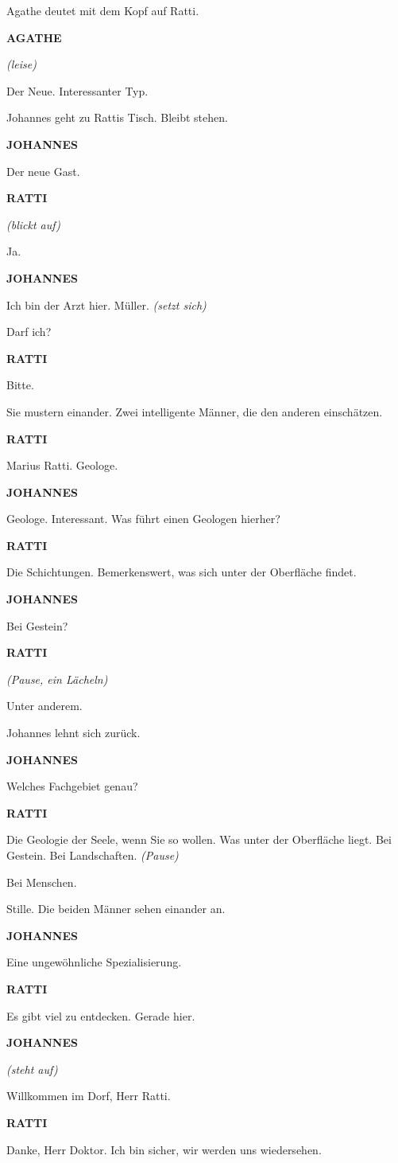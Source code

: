 \documentclass[11pt,a4paper,twoside]{book}
\newcommand{\figur}[1]{%
    \vspace{0.5em}
    \noindent\hspace{3cm}\textbf{\MakeUppercase{#1}}\\
    \hspace{3cm}
}
\newcommand{\regieanweisung}[1]{%
    \textit{(#1)}
}
\begin{document}
Agathe deutet mit dem Kopf auf Ratti.

\begin{dialogbox}
\figur{Agathe}
\regieanweisung{leise}
Der Neue. Interessanter Typ.
\end{dialogbox}

Johannes geht zu Rattis Tisch. Bleibt stehen.

\begin{dialogbox}
\figur{Johannes}
Der neue Gast.

\figur{Ratti}
\regieanweisung{blickt auf}
Ja.

\figur{Johannes}
Ich bin der Arzt hier. Müller.
\regieanweisung{setzt sich}
Darf ich?

\figur{Ratti}
Bitte.
\end{dialogbox}

Sie mustern einander. Zwei intelligente Männer, die den anderen einschätzen.

\begin{dialogbox}
\figur{Ratti}
Marius Ratti. Geologe.

\figur{Johannes}
Geologe. Interessant. Was führt einen Geologen hierher?

\figur{Ratti}
Die Schichtungen. Bemerkenswert, was sich unter der Oberfläche findet.

\figur{Johannes}
Bei Gestein?

\figur{Ratti}
\regieanweisung{Pause, ein Lächeln}
Unter anderem.
\end{dialogbox}

Johannes lehnt sich zurück.

\begin{dialogbox}
\figur{Johannes}
Welches Fachgebiet genau?

\figur{Ratti}
Die Geologie der Seele, wenn Sie so wollen. Was unter der Oberfläche liegt. Bei Gestein. Bei Landschaften.
\regieanweisung{Pause}
Bei Menschen.
\end{dialogbox}

Stille. Die beiden Männer sehen einander an.

\begin{dialogbox}
\figur{Johannes}
Eine ungewöhnliche Spezialisierung.

\figur{Ratti}
Es gibt viel zu entdecken. Gerade hier.

\figur{Johannes}
\regieanweisung{steht auf}
Willkommen im Dorf, Herr Ratti.

\figur{Ratti}
Danke, Herr Doktor. Ich bin sicher, wir werden uns wiedersehen.
\end{dialogbox}
\end{document}

